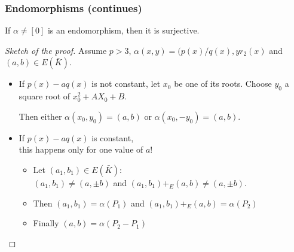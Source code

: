 \documentclass[10pt,handout]{beamer} %
\begin{document}
\begin{frame}
\frametitle{Endomorphisms (continues)}

\begin{theorem} If $\alpha\neq[0]$ is an endomorphism, then it is surjective.
\end{theorem}\pause

\begin{proof}[Sketch of the proof] Assume \alert{$p>3$}, \alert{$\alpha(x,y)=(p(x)/q(x),yr_2(x)$} and \alert{$(a,b)\in E(\bar{K})$}.\medskip

\begin{itemize}
  \item If \alert{$p(x)-aq(x)$} is not constant, let $x_0$ be one of its roots.
Choose $y_0$ a square root of $x_0^2+AX_0+B$.\medskip

Then either \alert{$\alpha(x_0,y_0)=(a,b)$} or \alert{$\alpha(x_0,-y_0)=(a,b)$}.\medskip

  \item If \alert{$p(x)-aq(x)$} is  constant,\\
\hfill   this happens only for one value of $a$!
\begin{itemize}
\item[] Let \alert{$(a_1,b_1)\in E(\bar{K})$}:\\
\alert{$(a_1,b_1)\neq (a,\pm b)$} and \alert{$(a_1,b_1)+_E(a, b)\neq (a,\pm b).$}\medskip

\item[] Then \alert{$(a_1,b_1)=\alpha(P_1)$} and \alert{$(a_1,b_1)+_E(a,b)=\alpha(P_2)$}\medskip

\item[] Finally \alert{$(a,b)=\alpha(P_2-P_1)$}
\end{itemize}
\end{itemize}
\end{proof}
\end{frame}
\end{document}
